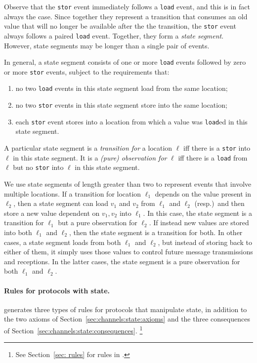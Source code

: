 Observe that the \verb|stor| event immediately follows a \verb|load|
event, and this is in fact always the case.  Since together they
represent a transition that consumes an old value that will no longer
be available after the the transition, the \verb|stor| event always
follows a paired \verb|load| event.  Together, they form a \emph{state
  segment}.  However, state segments may be longer than a single pair
of events.

In general, a state segment consists of one or more \verb|load|
events followed by zero or more \verb|stor| events, subject to the
requirements that:
%
\begin{enumerate}
  \item no two \verb|load| events in this state segment load from the
  same location;
  \item no two \verb|stor| events in this state segment store into the
  same location;
  \item each \verb|stor| event stores into a location from which a
  value was \verb|load|ed in this state segment.
\end{enumerate}
%
A particular state segment is a \emph{transition for} a location
$\ell$ iff there is a \verb|stor| into $\ell$ in this state segment.
It is a \emph{(pure) observation for} $\ell$ iff there is a
\verb|load| from $\ell$ but no \verb|stor| into $\ell$ in this state
segment.

We use state segments of length greater than two to represent events
that involve multiple locations.  If a transition for location
$\ell_1$ depends on the value present in $\ell_2$, then a state
segment can load $v_1$ and $v_2$ from $\ell_1$ and $\ell_2$
(resp.)~and then store a new value dependent on $v_1,v_2$ into
$\ell_1$.  In this case, the state segment is a transition for
$\ell_1$ but a pure observation for $\ell_2$.  If instead new values
are stored into both $\ell_1$ and $\ell_2$, then the state segment is
a transition for both.  In other cases, a state segment loads from
both $\ell_1$ and $\ell_2$, but instead of storing back to either of
them, it simply uses those values to control future message
transmissions and receptions.  In the latter cases, the state segment
is a pure observation for both $\ell_1$ and $\ell_2$.

\paragraph{Rules for protocols with
  state.}  \label{state:gen:rules:start} {\cpsa} generates three types
of rules for protocols that manipulate state, in addition to the two
axioms of Section~\ref{sec:channels:state:axioms} and the three
consequences of Section~\ref{sec:channels:state:consequences}.%
%
\footnote{See Section~\ref{sec: rules} for rules in {\cpsa}.}

